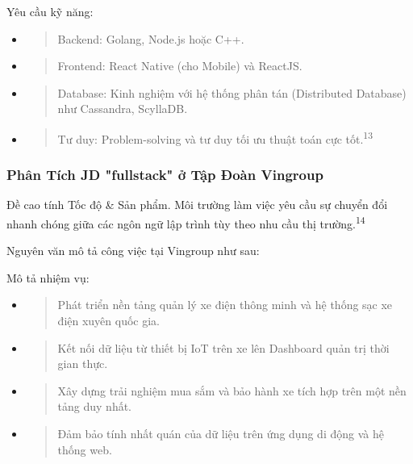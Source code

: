 \documentclass[12pt,a4paper]{article}
\begin{document}
Yêu cầu kỹ năng:
\begin{itemize}
\item
  \begin{quote}
  Backend: Golang, Node.js hoặc C++.
  \end{quote}
\item
  \begin{quote}
  Frontend: React Native (cho Mobile) và ReactJS.
  \end{quote}
\item
  \begin{quote}
  Database: Kinh nghiệm với hệ thống phân tán (Distributed Database) như Cassandra, ScyllaDB.
  \end{quote}
\item
  \begin{quote}
  Tư duy: Problem-solving và tư duy tối ưu thuật toán cực tốt.\textsuperscript{13}
  \end{quote}
\end{itemize}

\subsubsection{Phân Tích JD "fullstack" ở Tập Đoàn Vingroup}

Đề cao tính Tốc độ \& Sản phẩm. Môi trường làm việc yêu cầu sự chuyển đổi nhanh chóng giữa các ngôn ngữ lập trình tùy theo nhu cầu thị trường.\textsuperscript{14}

Nguyên văn mô tả công việc tại Vingroup như sau:

Mô tả nhiệm vụ:
\begin{itemize}
\item
  \begin{quote}
  Phát triển nền tảng quản lý xe điện thông minh và hệ thống sạc xe điện xuyên quốc gia.
  \end{quote}
\item
  \begin{quote}
  Kết nối dữ liệu từ thiết bị IoT trên xe lên Dashboard quản trị thời gian thực.
  \end{quote}
\item
  \begin{quote}
  Xây dựng trải nghiệm mua sắm và bảo hành xe tích hợp trên một nền tảng duy nhất.
  \end{quote}
\item
  \begin{quote}
  Đảm bảo tính nhất quán của dữ liệu trên ứng dụng di động và hệ thống web.
  \end{quote}
\end{itemize}
\end{document}

